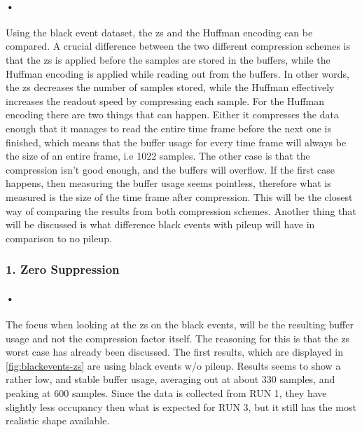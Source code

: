 \documentclass[a4paper, 12pt]{report}
\begin{document}
\paragraph{•}
Using the black event dataset, the \gls{zs} and the Huffman encoding can be compared.
A crucial difference between the two different compression schemes is that the \gls{zs} is applied before the samples are stored in the buffers, while the Huffman encoding is applied while reading out from the buffers.
In other words, the \gls{zs} decreases the number of samples stored, while the Huffman effectively increases the readout speed by compressing each sample.
For the Huffman encoding there are two things that can happen.
Either it compresses the data enough that it manages to read the entire time frame before the next one is finished, which means that the buffer usage for every time frame will always be the size of an entire frame, i.e 1022 samples.
The other case is that the compression isn't good enough, and the buffers will overflow.
If the first case happens, then measuring the buffer usage seems pointless, therefore what is measured is the size of the time frame after compression.
This will be the closest way of comparing the results from both compression schemes.
Another thing that will be discussed is what difference black events with pileup will have in comparison to no pileup.


\subsubsection{1. Zero Suppression}

\paragraph{•}
The focus when looking at the \gls{zs} on the black events, will be the resulting buffer usage and not the compression factor itself.
The reasoning for this is that the \gls{zs} worst case has already been discussed.
The first results, which are displayed in \ref{fig:blackevents-zs} are using black events w/o pileup.
Results seems to show a rather low, and stable buffer usage, averaging out at about 330 samples, and peaking at 600 samples.
Since the data is collected from RUN 1, they have slightly less occupancy then what is expected for RUN 3, but it still has the most realistic shape available.
\end{document}
